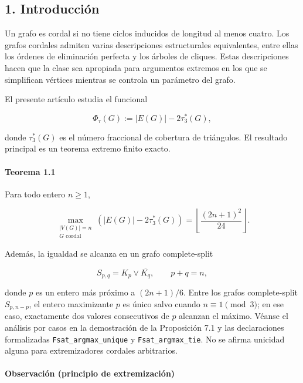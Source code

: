 \documentclass[
  spanish,
  11pt,
  a4paper,
]{article}
\begin{document}
\subsection{1. Introducción}\label{introducciuxf3n}

Un grafo es cordal si no tiene ciclos inducidos de longitud al menos cuatro. Los grafos cordales admiten varias descripciones estructurales equivalentes, entre ellas los órdenes de eliminación perfecta y los árboles de cliques. Estas descripciones hacen que la clase sea apropiada para argumentos extremos en los que se simplifican vértices mientras se controla un parámetro del grafo.

El presente artículo estudia el funcional

\[
\Phi_\tau(G):=|E(G)|-2\tau_3^*(G),
\]

donde \(\tau_3^*(G)\) es el número fraccional de cobertura de triángulos. El resultado principal es un teorema extremo finito exacto.

\paragraph{Teorema 1.1}\label{teorema-1.1}

Para todo entero \(n\ge1\),

\[
\boxed{
\max_{\substack{|V(G)|=n\\G\text{ cordal}}}
\left(
|E(G)|-2\tau_3^*(G)
\right)
=
\left\lfloor\frac{(2n+1)^2}{24}\right\rfloor.
}
\]

Además, la igualdad se alcanza en un grafo complete-split

\[
S_{p,q}=K_p\vee\overline{K_q},
\qquad
p+q=n,
\]

donde \(p\) es un entero más próximo a \((2n+1)/6\). Entre los grafos complete-split \(S_{p,n-p}\), el entero maximizante \(p\) es único salvo cuando \(n\equiv1\pmod3\); en ese caso, exactamente dos valores consecutivos de \(p\) alcanzan el máximo. Véanse el análisis por casos en la demostración de la Proposición 7.1 y las declaraciones formalizadas \texttt{Fsat\_argmax\_unique} y \texttt{Fsat\_argmax\_tie}. No se afirma unicidad alguna para extremizadores cordales arbitrarios.

\paragraph{Observación (principio de extremización)}\label{observaciuxf3n-principio-de-extremizaciuxf3n}
\end{document}
